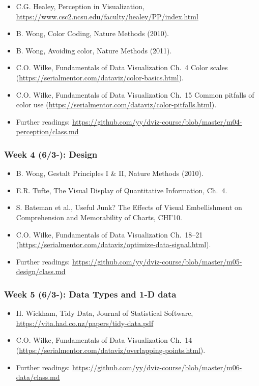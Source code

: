 \begin{itemize}\itemsep0em 
\item C.G. Healey, Perception in Visualization, \url{https://www.csc2.ncsu.edu/faculty/healey/PP/index.html}
\item B. Wong, Color Coding, Nature Methods (2010).
\item B. Wong, Avoiding color, Nature Methods (2011). 
\item C.O. Wilke, Fundamentals of Data Visualization Ch.~4 Color scales (\url{https://serialmentor.com/dataviz/color-basics.html}). 
\item C.O. Wilke, Fundamentals of Data Visualization Ch.~15 Common pitfalls of color use (\url{https://serialmentor.com/dataviz/color-pitfalls.html}).
\item Further readings: \url{https://github.com/yy/dviz-course/blob/master/m04-perception/class.md}
\end{itemize}	
\subsubsection{Week 4 (6/3-): Design }%

\begin{itemize}\itemsep0em 
\item B. Wong, Gestalt Principles I \& II, Nature Methods (2010). 
\item E.R. Tufte, The Visual Display of Quantitative Information, Ch.~4.
\item S. Bateman et al., Useful Junk? The Effects of Visual Embellishment on Comprehension and Memorability of Charts, CHI'10.
\item C.O. Wilke, Fundamentals of Data Visualization Ch.~18--21 (\url{https://serialmentor.com/dataviz/optimize-data-signal.html}). 
\item Further readings: \url{https://github.com/yy/dviz-course/blob/master/m05-design/class.md}
\end{itemize}	
\subsubsection{Week 5 (6/3-): Data Types and 1-D data } %

\begin{itemize}\itemsep0em 
\item H. Wickham, Tidy Data, Journal of Statistical Software, \url{https://vita.had.co.nz/papers/tidy-data.pdf}
\item C.O. Wilke, Fundamentals of Data Visualization Ch.~14 (\url{https://serialmentor.com/dataviz/overlapping-points.html}). 
\item Further readings: \url{https://github.com/yy/dviz-course/blob/master/m06-data/class.md}
\end{itemize}	

